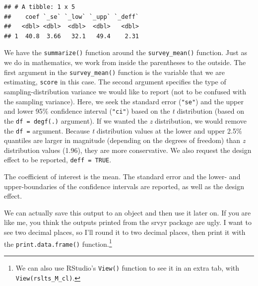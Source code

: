 \documentclass[
]{article}
\newenvironment{Shaded}{\begin{snugshade}}{\end{snugshade}}
\newcommand{\DataTypeTok}[1]{\textcolor[rgb]{0.13,0.29,0.53}{#1}}
\newcommand{\DecValTok}[1]{\textcolor[rgb]{0.00,0.00,0.81}{#1}}
\newcommand{\KeywordTok}[1]{\textcolor[rgb]{0.13,0.29,0.53}{\textbf{#1}}}
\newcommand{\NormalTok}[1]{#1}
\newcommand{\OperatorTok}[1]{\textcolor[rgb]{0.81,0.36,0.00}{\textbf{#1}}}
\newcommand{\OtherTok}[1]{\textcolor[rgb]{0.56,0.35,0.01}{#1}}
\newcommand{\StringTok}[1]{\textcolor[rgb]{0.31,0.60,0.02}{#1}}
\begin{document}
\begin{verbatim}
## # A tibble: 1 x 5
##    coef `_se` `_low` `_upp` `_deff`
##   <dbl> <dbl>  <dbl>  <dbl>   <dbl>
## 1  40.8  3.66   32.1   49.4    2.31
\end{verbatim}

We have the \texttt{summarize()} function around the \texttt{survey\_mean()} function. Just as we do in mathematics, we work from inside the parentheses to the outside. The first argument in the \texttt{survey\_mean()} function is the variable that we are estimating, \texttt{score} in this case. The second argument specifies the type of sampling-distribution variance we would like to report (not to be confused with the sampling variance). Here, we seek the standard error (\texttt{"se"}) and the upper and lower 95\% confidence interval (\texttt{"ci"}) based on the \emph{t} distribution (based on the \texttt{df\ =\ degf(.)} argument). If we wanted the \emph{z} distribution, we would remove the \texttt{df\ =} argument. Because \emph{t} distribution values at the lower and upper 2.5\% quantiles are larger in magnitude (depending on the degrees of freedom) than \emph{z} distribution values (1.96), they are more conservative. We also request the design effect to be reported, \texttt{deff\ =\ TRUE}.

The coefficient of interest is the mean. The standard error and the lower- and upper-boundaries of the confidence intervals are reported, as well as the design effect.

We can actually save this output to an object and then use it later on. If you are like me, you think the outputs printed from the srvyr package are ugly. I want to see two decimal places, so I'll round it to two decimal places, then print it with the \texttt{print.data.frame()} function.\footnote{We can also use RStudio's \texttt{View()} function to see it in an extra tab, with \texttt{View(rslts\_M\_cl)}.}

\begin{Shaded}
\end{Shaded}
\end{document}
